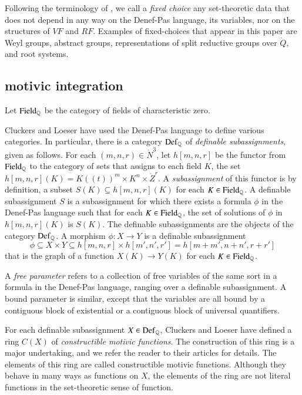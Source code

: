 Following the terminology of \cite{gordon}, we call  a {\it fixed choice} any set-theoretic data that does not depend in any way on the Denef-Pas
language, its variables, nor on the structures of $VF$ and $RF$.   Examples of fixed-choices that appear in this paper are Weyl groups, abstract groups,
representations of split reductive groups over $\ring{Q}$, and root systems.

\subsection{motivic integration}


Let ${\operatorname{Field}}_{\mathbb{Q}}$ be the category of fields of characteristic zero.  

Cluckers and Loeser have used the Denef-Pas language to define various categories.  In particular, there
is a category  ${\operatorname{Def}}_{\mathbb{Q}}$ of {\it definable subassignments}, given as follows.
For each $(m,n,r)\in\ring{N}^3$, let $h[m,n,r]$ be the functor from ${\operatorname{Field}}_{\mathbb{Q}}$ to the category of sets that assigns
to each field $K$, the set $h[m,n,r](K)=K((t))^m\times K^n\times \ring{Z}^r$.  A {\it subassignment} of this functor is by
definition, a subset $S(K) \subseteq h[m,n,r](K)$ for each $K\in{\operatorname{Field}}_{\mathbb{Q}}$.  
A definable subassignment $S$ is  a subassignment for which there exists a formula $\phi$ in the Denef-Pas language such that for each $K\in{\operatorname{Field}}_{\mathbb{Q}}$, 
the set of solutions of $\phi$ in $h[m,n,r](K)$ is $S(K)$.
The definable subassignments are the objects of the category ${\operatorname{Def}}_{\mathbb{Q}}$.  
A morphism $\phi:X\to Y$ is a definable subassignment 
\[
\phi\subseteq X\times Y\subseteq h[m,n,r]\times h[m',n',r'] = h[m+m',n+n',r+r']
\]
that is the graph of a function $X(K)\to Y(K)$ for each $K\in {\operatorname{Field}}_{\mathbb{Q}}$.

A {\it free parameter} refers to a collection of free variables of the same sort in a formula in the Denef-Pas language, ranging over a definable
subassignment.  A bound parameter is similar, except that the variables are all bound by a contiguous block of existential or
a contiguous block of universal quantifiers.

For each definable subassignment $X\in {\operatorname{Def}}_{\mathbb{Q}}$, Cluckers and Loeser have defined a ring $C(X)$ of 
{\it constructible motivic functions}.  The construction of this ring is a major undertaking, and we refer the reader
to their articles for details.     The elements of this ring are called constructible motivic functions.  Although
they behave in many ways as functions on $X$,  the elements of the ring are not literal functions in the set-theoretic
sense of function.

